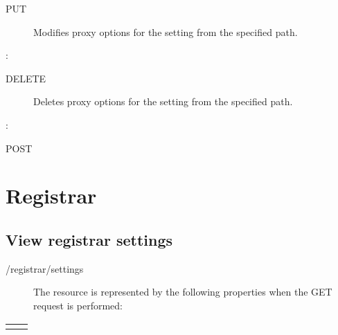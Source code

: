 \documentclass[letterpaper,10pt,english]{sphinxmanual}
\begin{document}
\begin{sphinxVerbatim}[commandchars=\\\{\}]
\end{sphinxVerbatim}
\begin{description}
\item[{ PUT}] \leavevmode
Modifies proxy options for the setting from the specified path.

\end{description}

:

\begin{sphinxVerbatim}[commandchars=\\\{\}]
\end{sphinxVerbatim}
\begin{description}
\item[{ DELETE}] \leavevmode
Deletes proxy options for the setting from the specified path.

\end{description}

:

\begin{sphinxVerbatim}[commandchars=\\\{\}]
\end{sphinxVerbatim}

 POST


\section{Registrar}
\label{\detokenize{restapi:registrar}}

\subsection{View registrar settings}
\label{\detokenize{restapi:view-registrar-settings}}
 /registrar/settings
\begin{description}
\item[{}] \leavevmode
The resource is represented by the following properties when the GET request is performed:

\end{description}


\begin{savenotes}\sphinxattablestart
\centering
\begin{tabulary}{\linewidth}[t]{|T|T|}
\hline

&
\\
\hline&\\
\hline
\end{tabulary}
\par
\sphinxattableend\end{savenotes}
\end{document}
